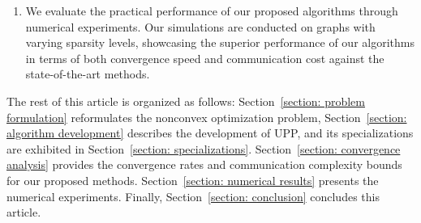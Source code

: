 \documentclass[12pt,draftcls,onecolumn]{IEEEtran}
\begin{document}
\begin{enumerate}
    \item[4)] We evaluate the practical performance of our proposed algorithms through numerical experiments. Our simulations are conducted on graphs with varying sparsity levels, showcasing the superior performance of our algorithms in terms of both convergence speed and communication cost against the state-of-the-art methods.
\end{enumerate}


The rest of this article is organized as follows: Section~\ref{section: problem formulation} reformulates the nonconvex optimization problem, Section~\ref{section: algorithm development} describes the development of UPP, and its specializations are exhibited in Section~\ref{section: specializations}. Section~\ref{section: convergence analysis} provides the convergence rates and communication complexity bounds for our proposed methods. Section~\ref{section: numerical results} presents the numerical experiments. Finally, Section~\ref{section: conclusion} concludes this article.
\end{document}
